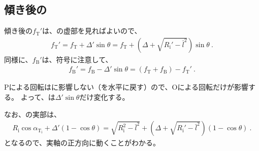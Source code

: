 \subsection{傾き後の\AlocationLength}
傾き後の\TopReAlocationLength$f_\mathrm T'$は、の虚部を見ればよいので、
\begin{align}
  \label{eq:saiallocationT}
  f_\mathrm T'
  = f_\mathrm T+\Delta'\sin\theta
  = f_\mathrm T+\left(\Delta+\sqrt{R_\mathrm i'-\bar l^2}\right)\sin\theta\ .
\end{align}
同様に、\BottomReAlocationLength$f_\mathrm B'$は、符号に注意して、
\begin{align*}
  f_\mathrm B' = f_\mathrm B-\Delta'\sin\theta = (f_\mathrm T+f_\mathrm B)-f_\mathrm T'\ .
\end{align*}
\begin{hosoku}
\TableCenter Pによる回転は\AlocationLength に影響しない（\EndFace を水平に戻す）ので、\CurvatureCenter Oによる回転だけが影響する。
よって、\AlocationLength は$\Delta'\sin\theta$だけ変化する。
\end{hosoku}
なお、の実部は、
\begin{align*}
  R_\mathrm i\cos\alpha_{\mathrm T_\mathrm i}+\Delta'(1-\cos\theta)
  = \sqrt{R_\mathrm i^2-\bar l^2}+\left(\Delta+\sqrt{R_\mathrm i'-\bar l^2}\right)(1-\cos\theta)\ .
\end{align*}
となるので、実軸の正方向に動くことがわかる。


